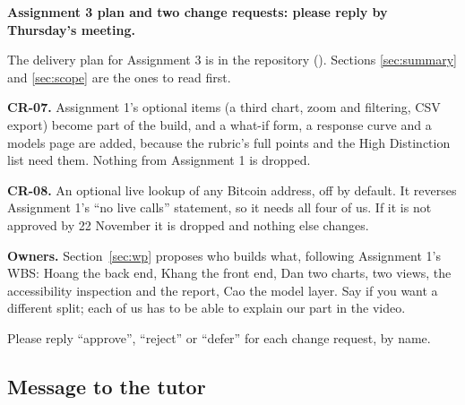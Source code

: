 \begin{summarybox}
\textbf{Assignment 3 plan and two change requests: please reply by Thursday's meeting.}

The delivery plan for Assignment 3 is in the repository (). Sections
\ref{sec:summary} and \ref{sec:scope} are the ones to read first.

\textbf{CR-07.} Assignment 1's optional items (a third chart, zoom and filtering, CSV export) become
part of the build, and a what-if form, a response curve and a models page are added, because the
rubric's full points and the High Distinction list need them. Nothing from Assignment 1 is dropped.

\textbf{CR-08.} An optional live lookup of any Bitcoin address, off by default. It reverses
Assignment 1's ``no live calls'' statement, so it needs all four of us. If it is not approved by
22 November it is dropped and nothing else changes.

\textbf{Owners.} Section~\ref{sec:wp} proposes who builds what, following Assignment 1's WBS: Hoang
the back end, Khang the front end, Dan two charts, two views, the accessibility inspection and the
report, Cao the model layer. Say if you want a different split; each of us has to be able to explain
our part in the video.

Please reply ``approve'', ``reject'' or ``defer'' for each change request, by name.
\end{summarybox}

\subsection{Message to the tutor}

